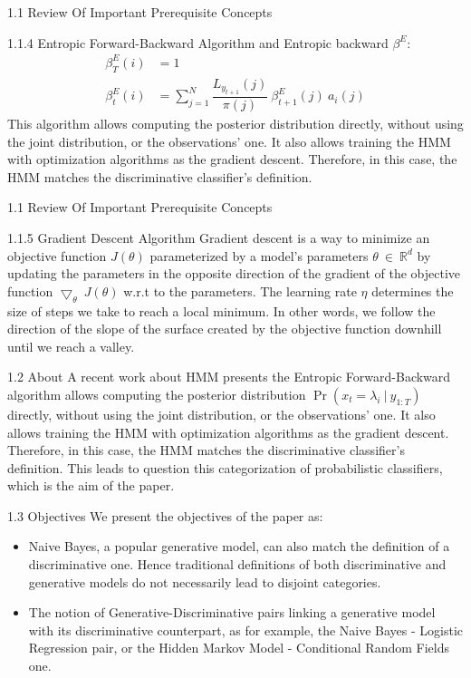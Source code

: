 \documentclass{beamer}
\providecommand{\pr}[1]{\ensuremath{\Pr\left(#1\right)}}
\begin{document}
\begin{frame}{1.1 Review Of Important Prerequisite Concepts}
\begin{block}{1.1.4 Entropic Forward-Backward Algorithm}
and Entropic backward $\beta^{E}$:
\begin{equation}
\begin{split}
    \beta_{T}^{E}(i) &= 1\\
    \beta_{t}^{E}(i) &= \sum_{j=1}^{N}\dfrac{L_{y_{t+1}}(j)}{\pi(j)}\  \beta_{t+1}^{E}(j)\ a_i(j)
\end{split}
\end{equation}
This algorithm allows computing the posterior distribution directly, without using the joint distribution, or the observations’ one. It also allows training the HMM with optimization algorithms as the gradient descent. Therefore, in this case, the HMM matches the discriminative classifier’s definition.
\end{block} 
\end{frame}
\begin{frame}{1.1 Review Of Important Prerequisite Concepts}
\begin{block}{1.1.5 Gradient Descent Algorithm}
Gradient descent is a way to minimize an objective function $J(\theta)$ parameterized by a model's parameters $\theta\ \in\ \mathbb{R}^d$ by updating the parameters in the opposite direction of the gradient of the objective function $\bigtriangledown_\theta\ J(\theta)$ w.r.t to the parameters. The learning rate $\eta$ determines the size of steps we take to reach a local minimum. In other words, we follow the direction of the slope of the surface created by the objective function downhill until we reach a valley.
\end{block}
\end{frame}
\begin{frame}{1.2 About}
    A recent work about HMM presents the Entropic Forward-Backward algorithm allows computing the posterior distribution $\pr{x_t = \lambda_i\ |\ y_{1:T}}$ directly, without using the joint distribution, or the observations’ one. It also allows training the HMM with optimization algorithms as the gradient descent. Therefore, in this case, the
HMM matches the discriminative classifier’s definition. This leads to question this categorization of probabilistic classifiers, which is the aim of the paper. 
\end{frame}
\begin{frame}{1.3 Objectives}
We present the objectives of the paper as:
    \begin{itemize}
        \item Naive Bayes, a popular generative model, can also match the definition of a discriminative one. Hence traditional definitions of both discriminative and generative models do not necessarily lead to disjoint categories.
        \item The notion of Generative-Discriminative pairs linking a  generative model with its discriminative counterpart, as for example, the Naive Bayes - Logistic Regression pair, or the Hidden Markov Model - Conditional Random Fields one.
    \end{itemize}
\end{frame}
\end{document}
